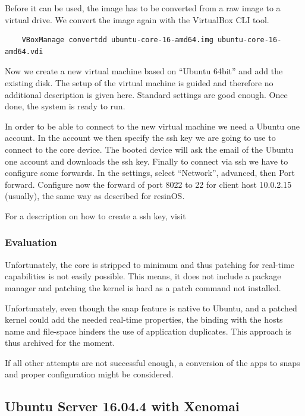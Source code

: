 \documentclass[]{scrartcl}
\begin{document}
Before it can be used, the image has to be converted from a raw image to a virtual drive. We convert the image again with the VirtualBox CLI tool.

\begin{verbatim}
	VBoxManage convertdd ubuntu-core-16-amd64.img ubuntu-core-16-amd64.vdi
\end{verbatim}

Now we create a new virtual machine based on ``Ubuntu 64bit'' and add the existing disk. The setup of the virtual machine is guided and therefore no additional description is given here. Standard settings are good enough. Once done, the system is ready to run.

In order to be able to connect to the new virtual machine we need a Ubuntu one account. In the account we then specify the ssh key we are going to use to connect to the core device. The booted device will ask the email of the Ubuntu one account and downloads the ssh key. Finally to connect via ssh we have to configure some forwards. In the settings, select ``Network'', advanced, then Port forward. Configure now the forward of port 8022 to 22 for client host 10.0.2.15 (usually), the same way as described for resinOS.

For a description on how to create a ssh key, visit \cite{atlassian01}

\subsubsection{Evaluation}

Unfortunately, the core is stripped to minimum and thus patching for real-time capabilities is not easily possible. This means, it does not include a package manager and patching the kernel is hard as a patch command not installed.

Unfortunately, even though the snap feature is native to Ubuntu, and a patched kernel could add the needed real-time properties, the binding with the hosts name and file-space hinders the use of application duplicates. This approach is thus archived for the moment.

If all other attempts are not successful enough, a conversion of the apps to snaps and proper configuration might be considered.

\subsection{Ubuntu Server 16.04.4 with Xenomai}
\end{document}
